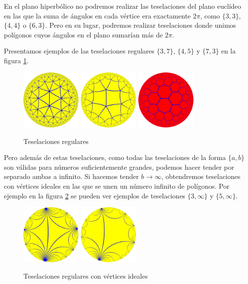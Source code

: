 \documentclass{article}
\theoremstyle{plain}
\theoremstyle{definition}
\theoremstyle{remark}
\begin{document}
En el plano hiperbólico no podremos realizar las teselaciones del
plano euclídeo en las que la suma de ángulos en cada vértice era
exactamente $2\pi$, como $\{3,3\}$, $\{4,4\}$ o $\{6,3\}$. Pero en su
lugar, podremos realizar teselaciones donde unimos polígonos cuyos
ángulos en el plano sumarían más de $2\pi$.

Presentamos ejemplos de las teselaciones regulares $\{3,7\}$, $\{4,5\}$
y $\{7,3\}$ en la figura \ref{tiling}.

\begin{figure}[ht!]
  \centering
  \includegraphics[width=30mm]{./tiling-3-7.png}
  \includegraphics[width=30mm]{./tiling-4-5.png}
  \includegraphics[width=30mm]{./tiling-7-3.png}
  \caption{Teselaciones regulares \label{tiling}}
\end{figure}

Pero además de estas teselaciones, como todas las teselaciones de
la forma $\{a,b\}$ son válidas para números suficientemente grandes,
podemos hacer tender por separado ambas a infinito. Si hacemos tender
$b \to \infty$, obtendremos teselaciones con vértices ideales en las
que se unen un número infinito de polígonos. Por ejemplo en la
figura \ref{tiling2} se pueden ver ejemplos de teselaciones $\{3,\infty\}$
y $\{5,\infty\}$.

\begin{figure}[ht!]
  \centering
  \includegraphics[width=30mm]{./tiling-3-i.png}
  \includegraphics[width=30mm]{./tiling-5-i.png}
  \caption{Teselaciones regulares con vértices ideales \label{tiling2}}
\end{figure}
\end{document}
